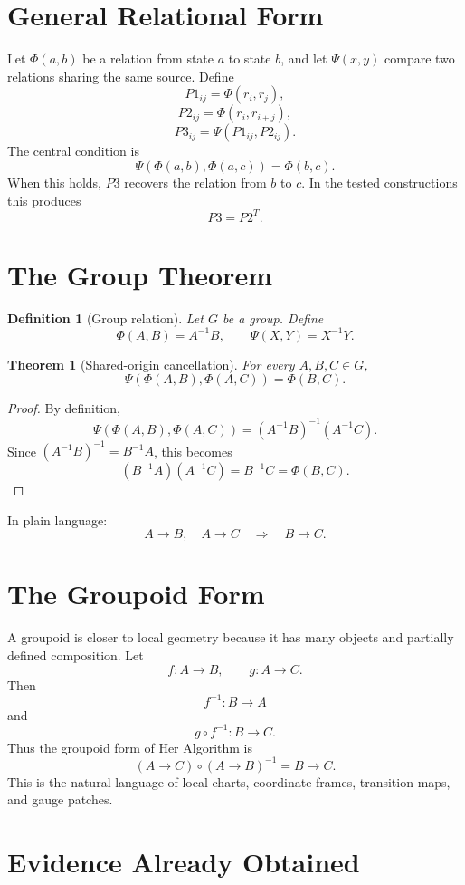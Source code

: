 \documentclass[11pt]{article}
\newtheorem{theorem}{Theorem}
\newtheorem{definition}{Definition}
\newcommand{\HA}{Her Algorithm}
\newcommand{\PhiR}{\Phi}
\newcommand{\PsiI}{\Psi}
\begin{document}
\section{General Relational Form}

Let \(\PhiR(a,b)\) be a relation from state \(a\) to state \(b\), and let \(\PsiI(x,y)\) compare two relations sharing the same source. Define
\[
P1_{ij}=\PhiR(r_i,r_j),
\]
\[
P2_{ij}=\PhiR(r_i,r_{i+j}),
\]
\[
P3_{ij}=\PsiI(P1_{ij},P2_{ij}).
\]
The central condition is
\[
\boxed{\PsiI(\PhiR(a,b),\PhiR(a,c))=\PhiR(b,c).}
\]
When this holds, \(P3\) recovers the relation from \(b\) to \(c\). In the tested constructions this produces
\[
\boxed{P3=P2^T.}
\]

\section{The Group Theorem}

\begin{definition}[Group relation]
Let \(G\) be a group. Define
\[
\PhiR(A,B)=A^{-1}B,\qquad \PsiI(X,Y)=X^{-1}Y.
\]
\end{definition}

\begin{theorem}[Shared-origin cancellation]
For every \(A,B,C\in G\),
\[
\PsiI(\PhiR(A,B),\PhiR(A,C))=\PhiR(B,C).
\]
\end{theorem}

\begin{proof}
By definition,
\[
\PsiI(\PhiR(A,B),\PhiR(A,C))=(A^{-1}B)^{-1}(A^{-1}C).
\]
Since \((A^{-1}B)^{-1}=B^{-1}A\), this becomes
\[
(B^{-1}A)(A^{-1}C)=B^{-1}C=\PhiR(B,C).
\]
\end{proof}

In plain language:
\[
\boxed{A\to B,\quad A\to C\quad\Rightarrow\quad B\to C.}
\]

\section{The Groupoid Form}

A groupoid is closer to local geometry because it has many objects and partially defined composition. Let
\[
f:A\to B,\qquad g:A\to C.
\]
Then
\[
f^{-1}:B\to A
\]
and
\[
g\circ f^{-1}:B\to C.
\]
Thus the groupoid form of \HA{} is
\[
\boxed{(A\to C)\circ(A\to B)^{-1}=B\to C.}
\]
This is the natural language of local charts, coordinate frames, transition maps, and gauge patches.

\section{Evidence Already Obtained}
\end{document}
